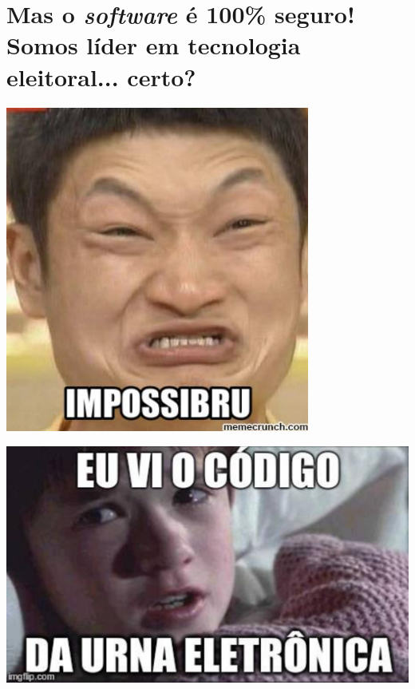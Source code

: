 \documentclass[10pt]{beamer}
\begin{document}
\section{Mas o \emph{software} é 100\% seguro!\\Somos líder em tecnologia eleitoral... certo?}

\begin{frame}
\begin{center}
\includegraphics[width=0.75\textwidth]{impossibru.png}
\end{center}
\end{frame}

\begin{frame}
\begin{center}
\includegraphics[width=\textwidth]{sextosentido.jpg}
\end{center}
\end{frame}
\end{document}
